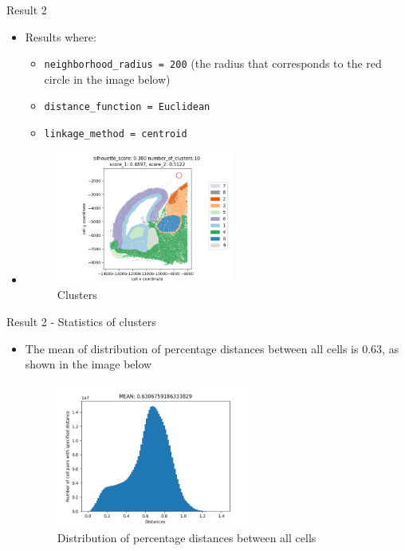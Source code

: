 \documentclass{beamer}
\begin{document}
\begin{frame}{Result 2}

\begin{itemize}
    \item<1-> Results where:
    \begin{itemize}
        \item<2-> \texttt{neighborhood\_radius = 200} (the radius that corresponds to the red circle in the image below)
        \item<3-> \texttt{distance\_function = Euclidean}
        \item<4-> \texttt{linkage\_method = centroid}
    \end{itemize}
    \item<5-> []
    	\begin{figure}
		\includegraphics[width=0.55\textwidth]{clusters_4.png}
    		\caption{Clusters}
	\end{figure} 
\end{itemize}



\end{frame}
\begin{frame}{Result 2 - Statistics of clusters}

\begin{itemize}
    \item<1-> The mean of distribution of percentage distances between all cells is $0.63$, as shown in the image below
    \begin{figure}
    \centering
    \includegraphics[width=0.6\textwidth]{all_distances4.png}
    \caption{Distribution of percentage distances between all cells}
\end{figure} 
   
\end{itemize}
\end{frame}
\end{document}
